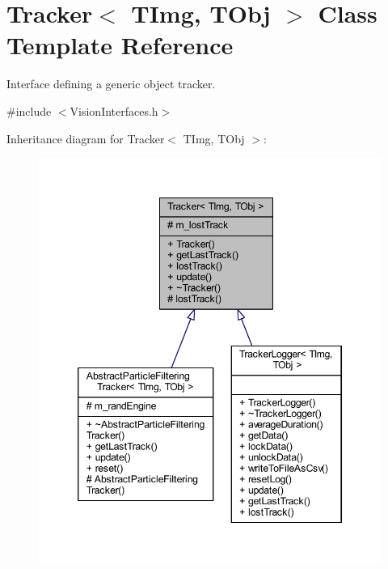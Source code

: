 \hypertarget{class_vision_core_1_1_interfaces_1_1_tracker}{}\section{Tracker$<$ T\+Img, T\+Obj $>$ Class Template Reference}
\label{class_vision_core_1_1_interfaces_1_1_tracker}


Interface defining a generic object tracker.  




{\ttfamily \#include $<$Vision\+Interfaces.\+h$>$}



Inheritance diagram for Tracker$<$ T\+Img, T\+Obj $>$\+:
\nopagebreak
\begin{figure}[H]
\begin{center}
\leavevmode
\includegraphics[width=346pt]{class_vision_core_1_1_interfaces_1_1_tracker__inherit__graph}
\end{center}
\end{figure}



